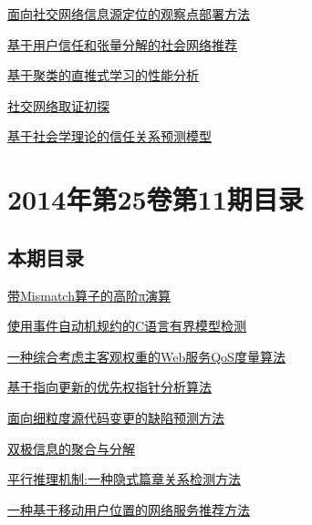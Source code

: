 \documentclass[a4paper]{article}
\begin{document}
\href{http://www.jos.org.cn/ch/reader/download_pdf.aspx?file_no=4723&year_id=2014&quarter_id=12&falg=1}{面向社交网络信息源定位的观察点部署方法}

\href{http://www.jos.org.cn/ch/reader/download_pdf.aspx?file_no=4725&year_id=2014&quarter_id=12&falg=1}{基于用户信任和张量分解的社会网络推荐}

\href{http://www.jos.org.cn/ch/reader/download_pdf.aspx?file_no=4726&year_id=2014&quarter_id=12&falg=1}{基于聚类的直推式学习的性能分析}

\href{http://www.jos.org.cn/ch/reader/download_pdf.aspx?file_no=4727&year_id=2014&quarter_id=12&falg=1}{社交网络取证初探}

\href{http://www.jos.org.cn/ch/reader/download_pdf.aspx?file_no=4731&year_id=2014&quarter_id=12&falg=1}{基于社会学理论的信任关系预测模型}


\section{\textbf{2014年第25卷第11期目录}}
\subsection{本期目录}
\href{http://www.jos.org.cn/ch/reader/download_pdf.aspx?file_no=4523&year_id=2014&quarter_id=11&falg=1}{带Mismatch算子的高阶π演算}

\href{http://www.jos.org.cn/ch/reader/download_pdf.aspx?file_no=4609&year_id=2014&quarter_id=11&falg=1}{使用事件自动机规约的C语言有界模型检测}

\href{http://www.jos.org.cn/ch/reader/download_pdf.aspx?file_no=4508&year_id=2014&quarter_id=11&falg=1}{一种综合考虑主客观权重的Web服务QoS度量算法}

\href{http://www.jos.org.cn/ch/reader/download_pdf.aspx?file_no=4596&year_id=2014&quarter_id=11&falg=1}{基于指向更新的优先权指针分析算法}

\href{http://www.jos.org.cn/ch/reader/download_pdf.aspx?file_no=4559&year_id=2014&quarter_id=11&falg=1}{面向细粒度源代码变更的缺陷预测方法}

\href{http://www.jos.org.cn/ch/reader/download_pdf.aspx?file_no=4525&year_id=2014&quarter_id=11&falg=1}{双极信息的聚合与分解}

\href{http://www.jos.org.cn/ch/reader/download_pdf.aspx?file_no=4546&year_id=2014&quarter_id=11&falg=1}{平行推理机制:一种隐式篇章关系检测方法}

\href{http://www.jos.org.cn/ch/reader/download_pdf.aspx?file_no=4561&year_id=2014&quarter_id=11&falg=1}{一种基于移动用户位置的网络服务推荐方法}
\end{document}
